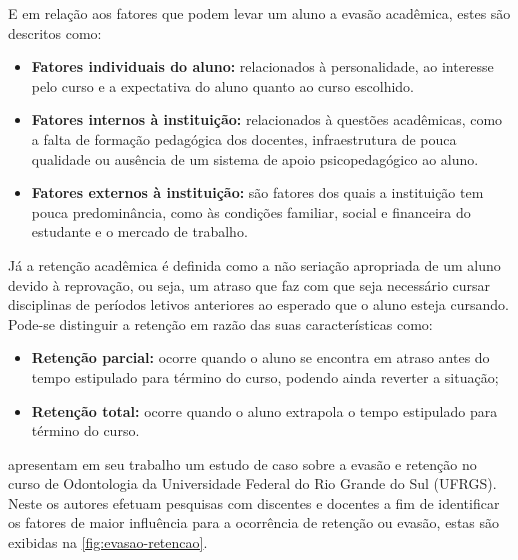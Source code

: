 E em relação aos fatores que podem levar um aluno a evasão acadêmica, estes são descritos como:

\begin{itemize}
    \item \textbf{Fatores individuais do aluno:} relacionados à personalidade, ao interesse pelo curso e a expectativa do aluno quanto ao curso escolhido.
    \item \textbf{Fatores internos à instituição:} relacionados à questões acadêmicas, como a falta de formação pedagógica dos docentes, infraestrutura de pouca qualidade ou ausência de um sistema de apoio psicopedagógico ao aluno.
    \item \textbf{Fatores externos à instituição:} são fatores dos quais a instituição tem pouca predominância, como às condições familiar, social e financeira do estudante e o mercado de trabalho.
\end{itemize}

Já a retenção acadêmica é definida como a não seriação apropriada de um aluno devido à reprovação, ou seja, um atraso que faz com que seja necessário cursar disciplinas de períodos letivos anteriores ao esperado que o aluno esteja cursando. Pode-se distinguir a retenção em razão das suas características como:

\begin{itemize}
    \item \textbf{Retenção parcial:} ocorre quando o aluno se encontra em atraso antes do tempo estipulado para término do curso, podendo ainda reverter a situação;
    \item \textbf{Retenção total:} ocorre quando o aluno extrapola o tempo estipulado para término do curso.
\end{itemize}

 apresentam em seu trabalho um estudo de caso sobre a evasão e retenção no curso de Odontologia da Universidade Federal do Rio Grande do Sul (UFRGS). 
Neste os autores efetuam pesquisas com discentes e docentes a fim de identificar os fatores de maior influência para a ocorrência de retenção ou evasão, estas são exibidas na \autoref{fig:evasao-retencao}.

